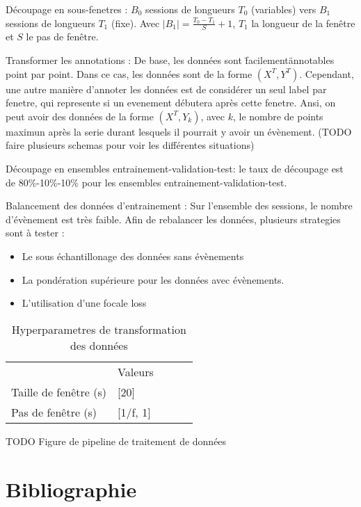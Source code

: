 \documentclass{article}
\begin{document}
    Découpage en sous-fenetres : $B_0$ sessions de longueurs $T_0$ (variables) vers $B_1$ sessions de longueurs $T_1$ (fixe). Avec $|B_1| = \frac{T_0-T_1}{S}+1$, $T_1$ la longueur de la fenêtre et $S$ le pas de fenêtre.

    Transformer les annotations : De base, les données sont \"facilement\" annotables point par point. Dans ce cas, les données sont de la forme $(X^T, Y^T)$. Cependant, une autre manière d'annoter les données est de considérer un seul label par fenetre, qui represente si un evenement débutera après cette fenetre. Ansi, on peut avoir des données de la forme $(X^T, Y_k)$, avec $k$, le nombre de points maximun après la serie durant lesquels il pourrait y avoir un évènement. (TODO faire plusieurs schemas pour voir les différentes situations)

    Découpage en ensembles entrainement-validation-test: le taux de découpage est de 80\%-10\%-10\% pour les ensembles entrainement-validation-test.

    Balancement des données d'entrainement : Sur l'ensemble des sessions, le nombre d'évènement est très faible. Afin de rebalancer les données, plusieurs strategies sont à tester :
    \begin{itemize}
        \item Le sous échantillonage des données sans évènements
        \item La pondération supérieure pour les données avec évènements.
        \item L'utilisation d'une focale loss
    \end{itemize}

    \begin{table}[]
    \begin{tabular}{l|l|lll}
    \cline{2-2}
                                                & Valeurs      &  &  &  \\ \cline{1-2}
    \multicolumn{1}{|l|}{Taille de fenêtre (s)} & {[}20{]}     &  &  &  \\ \cline{1-2}
    \multicolumn{1}{|l|}{Pas de fenêtre (s)}    & {[}1/f, 1{]} &  &  &  \\ \cline{1-2}
    \end{tabular}
    \caption{Hyperparametres de transformation des données}
    \end{table}

    TODO Figure de pipeline de traitement de données

    \section{Bibliographie}
\end{document}
